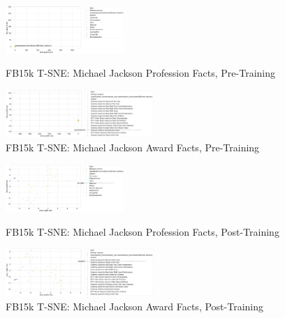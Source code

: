 
\begin{figure}[H]
	\parbox{.5\linewidth}{
   		\centering
    		\includegraphics[width=0.4\textwidth, height=0.2\textheight]{t_sne_train_profession}
		\captionsetup{justification=centering}
		\caption{FB15k T-SNE: Michael Jackson Profession Facts, Pre-Training}
		}
	\hfill
	\parbox{.5\linewidth}{
   		\centering
		\includegraphics[width=0.5\textwidth, height=0.2\textheight]{t_sne_train_award}
		\captionsetup{justification=centering}
		\caption{FB15k T-SNE: Michael Jackson Award Facts, Pre-Training}
		}
\end{figure}

\begin{figure}[H]
	\parbox{.5\linewidth}{
   		\centering
    		\includegraphics[width=0.4\textwidth, height=0.2\textheight]{t_sne_test_profession}
		\captionsetup{justification=centering}
		\caption{FB15k T-SNE: Michael Jackson Profession Facts, Post-Training}
		}
	\hfill
	\parbox{.5\linewidth}{
   		\centering
		\includegraphics[width=0.5\textwidth, height=0.2\textheight]{t_sne_test_award}
		\captionsetup{justification=centering}
		\caption{FB15k T-SNE: Michael Jackson Award Facts, Post-Training}
		}
\end{figure}

\newpage



